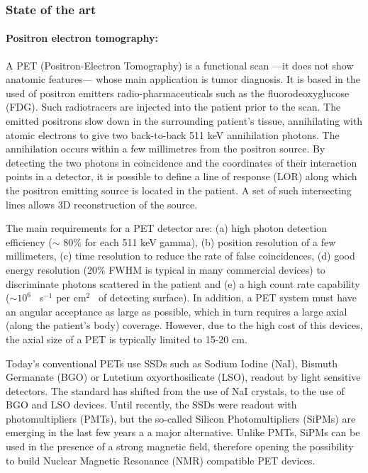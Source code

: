 \subsubsection*{State of the art}

\paragraph{Positron electron tomography:}

A PET (Positron-Electron Tomography) is a functional scan ---it does not show anatomic features--- whose main application is tumor diagnosis. It is based in the used of positron emitters radio-pharmaceuticals such as the fluorodeoxyglucose (FDG). Such radiotracers 
are injected into the patient prior to the scan. The emitted positrons slow down in the surrounding patient’s tissue, annihilating with atomic electrons to give two back-to-back 511 keV annihilation photons. The annihilation occurs within a few millimetres from the positron source. By detecting the two photons in coincidence and the coordinates of their interaction points in a detector, it is possible to define a line of response (LOR) along which the positron emitting source is located in the patient. A set of such intersecting lines allows 3D reconstruction of the source. 

The main requirements for a PET detector are: (a) high photon detection efficiency ($\sim$ 80\% for each 511 keV gamma), (b) position resolution of a few millimeters, (c) time resolution to reduce the rate of false coincidences, (d) good energy resolution (20\% FWHM is typical in many commercial devices) to discriminate photons scattered in the patient and (e) a high count rate capability ($\sim10^6$~ s$^{-1}$ per cm$^2$~ of detecting surface). In addition, a PET system must have an angular acceptance as large as possible, which in turn requires a large axial (along the patient's body) coverage. However, due to the high cost of this devices, the axial size  of a PET is typically limited to 15-20 cm. 

Today's conventional PETs use SSDs such as Sodium Iodine (NaI), Bismuth Germanate (BGO) or Lutetium oxyorthosilicate (LSO), readout by light sensitive detectors. The standard has shifted from the use of NaI crystals, to the use of BGO and LSO devices. Until recently, the SSDs were readout with photomultipliers (PMTs), but the so-called Silicon Photomultipliers (SiPMs) are emerging in the last few years a a major alternative. Unlike PMTs, SiPMs can be used in the presence of a strong magnetic field, therefore opening the possibility to build Nuclear Magnetic Resonance (NMR) compatible PET devices. 

